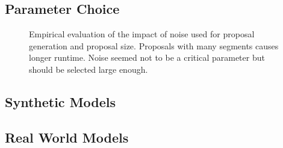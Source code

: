 \documentclass[10pt,twocolumn,letterpaper]{article}
\begin{document}
\subsection{Parameter Choice}
\begin{figure}
\centering
{}
\caption{Empirical evaluation of the impact of noise used for proposal generation and proposal size.
  Proposals with many segments causes longer runtime. Noise seemed not to be a critical parameter but should be selected large enough.
}
\end{figure}

\subsection{Synthetic Models}

\subsection{Real World Models}
\end{document}
